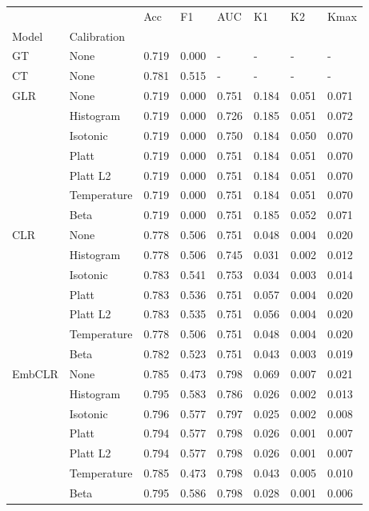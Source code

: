 \begin{tabular}{llllllll}
\toprule
 &  & Acc & F1 & AUC & K1 & K2 & Kmax \\
Model & Calibration &  &  &  &  &  &  \\
\midrule
GT & None & 0.719 & 0.000 & - & - & - & - \\
\cline{1-8}
CT & None & 0.781 & 0.515 & - & - & - & - \\
\cline{1-8}
\multirow[t]{7}{*}{GLR} & None & 0.719 & 0.000 & 0.751 & 0.184 & 0.051 & 0.071 \\
 & Histogram & 0.719 & 0.000 & 0.726 & 0.185 & 0.051 & 0.072 \\
 & Isotonic & 0.719 & 0.000 & 0.750 & 0.184 & 0.050 & 0.070 \\
 & Platt & 0.719 & 0.000 & 0.751 & 0.184 & 0.051 & 0.070 \\
 & Platt L2 & 0.719 & 0.000 & 0.751 & 0.184 & 0.051 & 0.070 \\
 & Temperature & 0.719 & 0.000 & 0.751 & 0.184 & 0.051 & 0.070 \\
 & Beta & 0.719 & 0.000 & 0.751 & 0.185 & 0.052 & 0.071 \\
\cline{1-8}
\multirow[t]{7}{*}{CLR} & None & 0.778 & 0.506 & 0.751 & 0.048 & 0.004 & 0.020 \\
 & Histogram & 0.778 & 0.506 & 0.745 & 0.031 & 0.002 & 0.012 \\
 & Isotonic & 0.783 & 0.541 & 0.753 & 0.034 & 0.003 & 0.014 \\
 & Platt & 0.783 & 0.536 & 0.751 & 0.057 & 0.004 & 0.020 \\
 & Platt L2 & 0.783 & 0.535 & 0.751 & 0.056 & 0.004 & 0.020 \\
 & Temperature & 0.778 & 0.506 & 0.751 & 0.048 & 0.004 & 0.020 \\
 & Beta & 0.782 & 0.523 & 0.751 & 0.043 & 0.003 & 0.019 \\
\cline{1-8}
\multirow[t]{7}{*}{EmbCLR} & None & 0.785 & 0.473 & 0.798 & 0.069 & 0.007 & 0.021 \\
 & Histogram & 0.795 & 0.583 & 0.786 & 0.026 & 0.002 & 0.013 \\
 & Isotonic & 0.796 & 0.577 & 0.797 & 0.025 & 0.002 & 0.008 \\
 & Platt & 0.794 & 0.577 & 0.798 & 0.026 & 0.001 & 0.007 \\
 & Platt L2 & 0.794 & 0.577 & 0.798 & 0.026 & 0.001 & 0.007 \\
 & Temperature & 0.785 & 0.473 & 0.798 & 0.043 & 0.005 & 0.010 \\
 & Beta & 0.795 & 0.586 & 0.798 & 0.028 & 0.001 & 0.006 \\
\cline{1-8}
\bottomrule
\end{tabular}
